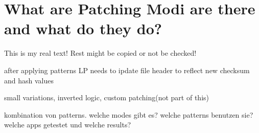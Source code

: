 \section{What are Patching Modi are there and what do they do?} \label{section:luckypatcher-modi}
This is my real text! Rest might be copied or not be checked!



%
after applying patterns LP needs to ipdate file header to reflect new checksum and hash values


small variations, inverted logic, custom patching(not part of this)

\cite{munteanLicense}
%

kombination von patterns.\newline
welche modes gibt es? welche patterns benutzen sie?\newline
welche apps getestet und welche results?
